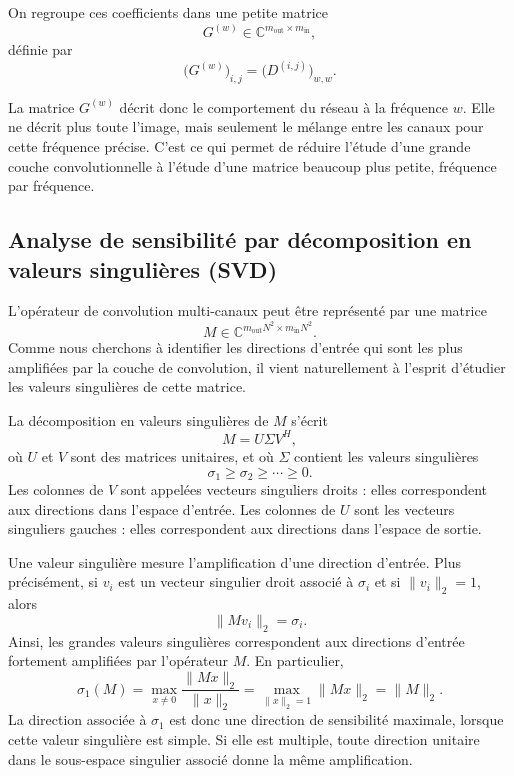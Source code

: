 On regroupe ces coefficients dans une petite matrice
\[
    G^{(w)} \in \mathbb{C}^{m_{\mathrm{out}}\times m_{\mathrm{in}}},
\]
définie par
\begin{equation}
    \bigl(G^{(w)}\bigr)_{i,j}
    =
    \bigl(D^{(i,j)}\bigr)_{w,w}.
    \label{eq:def_matrice_frequence}
\end{equation}

La matrice $G^{(w)}$ décrit donc le comportement du réseau à la fréquence $w$. Elle ne décrit plus
toute l'image, mais seulement le mélange entre les canaux pour cette fréquence précise. C'est ce
qui permet de réduire l'étude d'une grande couche convolutionnelle à l'étude d'une matrice beaucoup
plus petite, fréquence par fréquence.

\subsection{Analyse de sensibilité par décomposition en valeurs singulières (SVD)}

L'opérateur de convolution multi-canaux peut être représenté par une matrice
\[
    M \in \mathbb{C}^{m_{\mathrm{out}}N^2 \times m_{\mathrm{in}}N^2}.
\]
Comme nous cherchons à identifier les directions d'entrée qui sont les plus amplifiées par la couche de 
convolution, il vient naturellement à l'esprit d'étudier les valeurs singulières de cette matrice.

La décomposition en valeurs singulières de $M$ s'écrit
\[
    M = U\Sigma V^H,
\]
où $U$ et $V$ sont des matrices unitaires, et où $\Sigma$ contient les valeurs singulières
\[
    \sigma_1 \geq \sigma_2 \geq \cdots \geq 0.
\]
Les colonnes de $V$ sont appelées vecteurs singuliers droits : elles correspondent aux directions
dans l'espace d'entrée. Les colonnes de $U$ sont les vecteurs singuliers gauches : elles correspondent
aux directions dans l'espace de sortie.

Une valeur singulière mesure l'amplification d'une direction d'entrée. Plus précisément, si $v_i$ est
un vecteur singulier droit associé à $\sigma_i$ et si $\|v_i\|_2=1$, alors
\[
    \|Mv_i\|_2 = \sigma_i.
\]
Ainsi, les grandes valeurs singulières correspondent aux directions d'entrée fortement amplifiées par
l'opérateur $M$. En particulier,
\[
\sigma_1(M)
= \max_{x \neq 0} \frac{\|Mx\|_2}{\|x\|_2}
= \max_{\|x\|_2 = 1} \|Mx\|_2
= \|M\|_2.
\]
La direction associée à $\sigma_1$ est donc une direction de sensibilité maximale, lorsque cette valeur
singulière est simple. Si elle est multiple, toute direction unitaire dans le sous-espace singulier associé
donne la même amplification.

